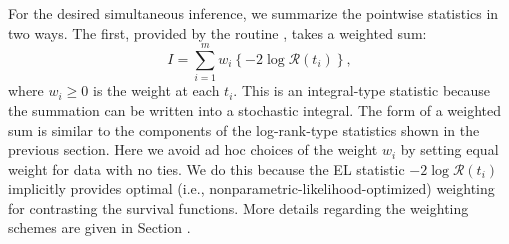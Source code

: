 For the desired simultaneous inference, we summarize the pointwise statistics in two ways. The first, provided by the routine , takes a weighted sum:
\begin{equation} 
\label{eq:sumELR}
I=\sum_{i=1}^m w_i \left\{-2 \log \mathcal{R}\left(t_i\right)\right\},
\end{equation}
where $w_i \ge 0$ is the weight at each $t_i$. This is an integral-type statistic because the summation can be written into a stochastic integral.
The form of a weighted sum is similar to the components of the log-rank-type statistics shown in the previous section. 
Here we avoid ad hoc choices of the weight $w_i$ by setting equal weight for data with no ties. We do this because the EL statistic $-2 \log \mathcal{R}(t_i)$ implicitly provides optimal (i.e., nonparametric-likelihood-optimized)
weighting for contrasting the survival functions. %
More details regarding the weighting schemes are given in Section .

